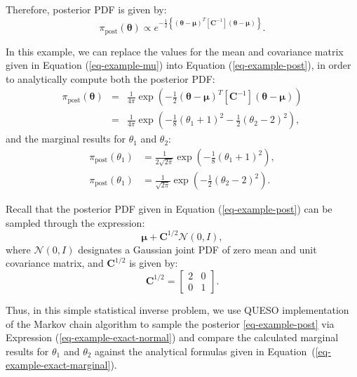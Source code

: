 Therefore,  posterior PDF is given by:
\begin{equation}\label{eq-example-post}
\pi_{\text{post}}(\boldsymbol{\theta}) \varpropto e^{-\frac{1}{2}\left\{(\boldsymbol{\theta}-\boldsymbol{\mu})^T[\mathbf{C}^{-1}](\boldsymbol{\theta}-\boldsymbol{\mu})\right\}}.
\end{equation}


In this example, we can replace the values for the mean and covariance matrix given in Equation (\ref{eq-example-mu}) into Equation (\ref{eq-example-post}), 
in order to analytically compute both the posterior PDF:
\begin{eqnarray*}\label{eq-example-exact-post}
\pi_{\text{post}}(\boldsymbol{\theta}) & = & \frac{1}{4\pi} \exp\left(-\frac{1}{2}(\boldsymbol{\theta}-\boldsymbol{\mu})^T[\mathbf{C}^{-1}](\boldsymbol{\theta}-\boldsymbol{\mu})\right) \\
                                       & = & \frac{1}{4\pi} \exp\left( -\frac{1}{8}(\theta_1+1)^2 - \frac{1}{2}(\theta_2-2)^2\right), \label{eq-example-exact-joint}
\end{eqnarray*}
and the marginal results for $\theta_1$ and $\theta_2$:
\begin{equation}\label{eq-example-exact-marginal}
\begin{split}
\pi_{\text{post}}(\theta_1) & =  \frac{1}{2\sqrt{2\pi}} \exp\left(-\frac{1}{8}(\theta_1+1)^2 \right), \\
\pi_{\text{post}}(\theta_1) & =  \frac{1}{ \sqrt{2\pi}} \exp\left(-\frac{1}{2}(\theta_2-2)^2 \right). 
\end{split}
\end{equation}



Recall that the posterior PDF given in 
Equation (\ref{eq-example-post}) can be sampled through the expression:
\begin{equation}\label{eq-example-exact-normal}
\boldsymbol{\mu}+\mathbf{C}^{1/2}\mathcal{N}(0,I),
\end{equation}
where $\mathcal{N}(0,I)$ designates a Gaussian joint PDF of zero mean and unit covariance matrix, and
$\mathbf{C}^{1/2}$ is given by:
\begin{equation*}
\mathbf{C}^{1/2} = 
\left[\begin{array}{cc}
2 & 0 \\
0 & 1
\end{array}\right].
\end{equation*}

Thus, in this simple statistical inverse problem, we use QUESO implementation of the Markov chain 
algorithm to sample the posterior \eqref{eq-example-post} via Expression (\ref{eq-example-exact-normal}) and compare the calculated marginal results for $\theta_1$ and $\theta_2$ 
against the analytical formulas given in Equation~(\ref{eq-example-exact-marginal}). 


